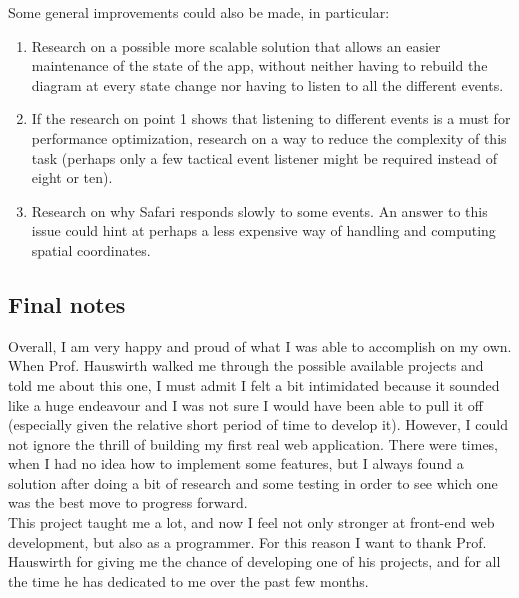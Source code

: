 \documentclass[]{usiinfbachelorproject}
\begin{document}
\vspace{\fill}
\pagebreak

\noindent Some general improvements could also be made, in particular:

\begin{enumerate}
	\item Research on a possible more scalable solution that allows an easier maintenance of the state of the app, without neither having to rebuild the diagram at every state change nor having to listen to all the different events.
	\item If the research on point 1 shows that listening to different events is a must for performance optimization, research on a way to reduce the complexity of this task (perhaps only a few tactical event listener might be required instead of eight or ten).
	\item Research on why Safari responds slowly to some events. An answer to this issue could hint at perhaps a less expensive way of handling and computing spatial coordinates.
\end{enumerate}

\subsection{Final notes}

Overall, I am very happy and proud of what I was able to accomplish on my own. When Prof. Hauswirth walked me through the possible available projects and told me about this one, I must admit I felt a bit intimidated because it sounded like a huge endeavour and I was not sure I would have been able to pull it off (especially given the relative short period of time to develop it). However, I could not ignore the thrill of building my first real web application. There were times, when I had no idea how to implement some features, but I always found a solution after doing a bit of research and some testing in order to see which one was the best move to progress forward.\\
This project taught me a lot, and now I feel not only stronger at front-end web development, but also as a programmer. For this reason I want to thank Prof. Hauswirth for giving me the chance of developing one of his projects, and for all the time he has dedicated to me over the past few months.

\vspace{\fill}

\pagebreak



\end{document}
